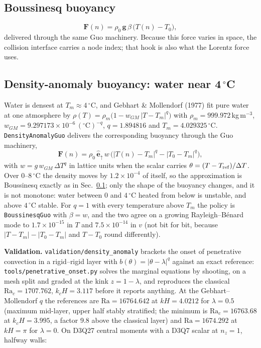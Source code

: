 \documentclass[11pt,a4paper]{article}
\newcommand{\code}[1]{\texttt{\small #1}}
\newcommand{\e}[1]{\times 10^{#1}}
\begin{document}
\subsection{Boussinesq buoyancy}
\label{sec:boussinesq}

\begin{equation}
  \bm{F}(n) = \rho_0\, \bm{g}\, \beta\,\big(T(n)-T_0\big),
\end{equation}
delivered through the same Guo machinery. Because this force varies in space, the
collision interface carries a node index; that hook is also what the Lorentz force
uses.

\subsection{Density-anomaly buoyancy: water near \texorpdfstring{4\,$^\circ$C}{4 C}}
\label{sec:density-anomaly}

Water is densest at $T_m \approx 4\,^\circ$C, and Gebhart \& Mollendorf (1977)
fit pure water at one atmosphere by
$\rho(T) = \rho_m\big(1 - w_{GM}\,|T - T_m|^{q}\big)$ with
$\rho_m = 999.972$\,kg\,m$^{-3}$, $w_{GM} = 9.297173\e{-6}\,(^\circ\mathrm{C})^{-q}$,
$q = 1.894816$ and $T_m = 4.029325\,^\circ$C. \code{DensityAnomalyGuo} delivers
the corresponding buoyancy through the Guo machinery,
\begin{equation}
  \bm{F}(n) = \rho_0\, \hat{\bm{e}}_{\uparrow}\, w\,
  \big(|T(n)-T_m|^{q} - |T_0-T_m|^{q}\big),
\end{equation}
with $w = g\,w_{GM}\,\Delta T^{q}$ in lattice units when the scalar carries
$\theta = (T - T_{\rm ref})/\Delta T$. Over 0--8\,$^\circ$C the density moves by
$1.2\e{-4}$ of itself, so the approximation is Boussinesq exactly as in
Sec.~\ref{sec:boussinesq}; only the shape of the buoyancy changes, and it is not
monotone: water between $0$ and $4\,^\circ$C heated from below is unstable, and
above $4\,^\circ$C stable. For $q=1$ with every temperature above $T_m$ the
policy is \code{BoussinesqGuo} with $\beta = w$, and the two agree on a growing
Rayleigh--B\'enard mode to $1.7\e{-15}$ in $T$ and $7.5\e{-14}$ in $v$ (not bit
for bit, because $|T-T_m|-|T_0-T_m|$ and $T-T_0$ round differently).

\textbf{Validation.} \code{validation/density\_anomaly} brackets the onset of
penetrative convection in a rigid--rigid layer with $b(\theta) =
|\theta-\lambda|^{q}$ against an exact reference: \code{tools/penetrative\_onset.py}
solves the marginal equations by shooting, on a mesh split and graded at the
kink $z = 1-\lambda$, and reproduces the classical $\mathrm{Ra}_c = 1707.762$,
$k_c H = 3.117$ before it reports anything. At the Gebhart--Mollendorf $q$ the
references are $\mathrm{Ra} = 16764.642$ at $kH = 4.0212$ for $\lambda = 0.5$
(maximum mid-layer, upper half stably stratified; the minimum is
$\mathrm{Ra}_c = 16763.68$ at $k_cH = 3.995$, a factor 9.8 above the classical
layer) and $\mathrm{Ra} = 1674.292$ at $kH = \pi$ for $\lambda = 0$. On D3Q27
central moments with a D3Q7 scalar at $n_z = 1$, halfway walls:
\end{document}
